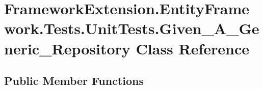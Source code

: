 \hypertarget{class_framework_extension_1_1_entity_framework_1_1_tests_1_1_unit_tests_1_1_given___a___generic___repository}{\section{Framework\-Extension.\-Entity\-Framework.\-Tests.\-Unit\-Tests.\-Given\-\_\-\-A\-\_\-\-Generic\-\_\-\-Repository Class Reference}
\label{class_framework_extension_1_1_entity_framework_1_1_tests_1_1_unit_tests_1_1_given___a___generic___repository}
}
\subsection*{Public Member Functions}
